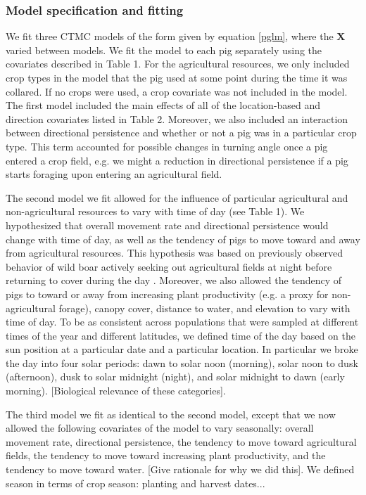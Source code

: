 \documentclass[a4paper]{article}
\begin{document}
\subsubsection*{Model specification and fitting}

We fit three CTMC models of the form given by equation \ref{pglm}, where the $\mathbf{X}$ varied between models. We fit the model to each pig separately using the covariates described in Table 1. For the agricultural resources, we only included crop types in the model that the pig used at some point during the time it was collared. If no crops were used, a crop covariate was not included in the model.  The first model included the main effects of all of the location-based and direction covariates listed in Table 2.  Moreover, we also included an interaction between directional persistence and whether or not a pig was in a particular crop type. This term accounted for possible changes in turning angle once a pig entered a crop field, e.g. we might a reduction in directional persistence if a pig starts foraging upon entering an agricultural field. 

The second model we fit allowed for the influence of particular agricultural and non-agricultural resources to vary with time of day (see Table 1). We hypothesized that overall movement rate and directional persistence would change with time of day, as well as the tendency of pigs to move toward and away from agricultural resources.  This hypothesis was based on previously observed behavior of wild boar actively seeking out agricultural fields at night before returning to cover during the day \citep{Thurfjell2009}. Moreover, we also allowed the tendency of pigs to toward or away from increasing plant productivity (e.g. a proxy for non-agricultural forage), canopy cover, distance to water, and elevation to vary with time of day. To be as consistent across populations that were sampled at different times of the year and different latitudes, we defined time of the day based on the sun position at a particular date and a particular location. In particular we broke the day into four solar periods: dawn to solar noon (morning), solar noon to dusk (afternoon), dusk to solar midnight (night), and solar midnight to dawn (early morning). [Biological relevance of these categories].

The third model we fit as identical to the second model, except that we now allowed the following covariates of the model to vary seasonally: overall movement rate, directional persistence, the tendency to move toward agricultural fields, the tendency to move toward increasing plant productivity, and the tendency to move toward water. [Give rationale for why we did this]. We defined season in terms of crop season: planting and harvest dates...
\end{document}
